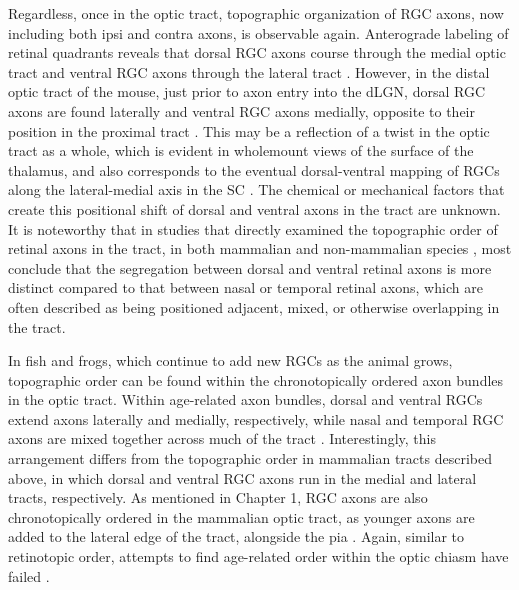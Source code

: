 Regardless, once in the optic tract, topographic organization of RGC axons, now including both ipsi and contra axons, is observable again.
Anterograde labeling of retinal quadrants reveals that dorsal RGC axons course through the medial optic tract and ventral RGC axons through the lateral tract \cite{chan1999changes,chan1994changes,plas2005pretarget,reese1993reestablishment,reese1990fibre,reh1983organization,torrealba1982studies}.%
However, in the distal optic tract of the mouse, just prior to axon entry into the dLGN, dorsal RGC axons are found laterally and ventral RGC axons medially, opposite to their position in the proximal tract \cite{plas2005pretarget}. %
This may be a reflection of a twist in the optic tract as a whole, which is evident in wholemount views of the surface of the thalamus, and also corresponds to the eventual dorsal-ventral mapping of RGCs along the lateral-medial axis in the SC \cite{plas2005pretarget}.
The chemical or mechanical factors that create this positional shift of dorsal and ventral axons in the tract are unknown.
It is noteworthy that in studies that directly examined the topographic order of retinal axons in the tract, in both mammalian \cite{chan1994changes,plas2005pretarget,reese1993reestablishment} and non-mammalian species \cite{ehrlich1984course,montgomery1998organization,reh1983organization,thanos1983investigations}, most conclude that the segregation between dorsal and ventral retinal axons is more distinct compared to that between nasal or temporal retinal axons, which are often described as being positioned adjacent, mixed, or otherwise overlapping in the tract.

In fish and frogs, which continue to add new RGCs as the animal grows, topographic order can be found within the chronotopically ordered axon bundles in the optic tract.
Within age-related axon bundles, dorsal and ventral RGCs extend axons laterally and medially, respectively, while nasal and temporal RGC axons are mixed together across much of the tract \cite{reh1983organization}.
Interestingly, this arrangement differs from the topographic order in mammalian tracts described above, in which dorsal and ventral RGC axons run in the medial and lateral tracts, respectively.
As mentioned in Chapter 1, RGC axons are also chronotopically ordered in the mammalian optic tract, as younger axons are added to the lateral edge of the tract, alongside the pia \cite{colello1992observations,reese1987distributionrat,reese1990fibre,reese1997chronotopic,walsh1985age}. %
Again, similar to retinotopic order, attempts to find age-related order within the optic chiasm have failed \cite{colello1998changing}.
